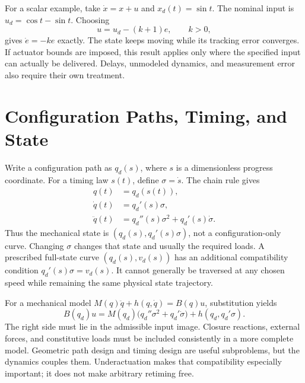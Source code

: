 For a scalar example, take $\dot x=x+u$ and $x_d(t)=\sin t$. The nominal input
is $u_d=\cos t-\sin t$. Choosing
\begin{equation}
 u=u_d-(k+1)e,\qquad k>0,
 \label{eq:motion_tracking_example}
\end{equation}
gives $\dot e=-ke$ exactly. The state keeps moving while its tracking error
converges. If actuator bounds are imposed, this result applies only where the
specified input can actually be delivered. Delays, unmodeled dynamics, and
measurement error also require their own treatment.

\section{Configuration Paths, Timing, and State}

Write a configuration path as $q_d(s)$, where $s$ is a dimensionless progress
coordinate. For a timing law $s(t)$, define $\sigma=\dot s$. The chain rule gives
\begin{equation}
 \begin{aligned}
 q(t)&=q_d(s(t)),\\
 \dot q(t)&=q_d'(s)\sigma,\\
 \ddot q(t)&=q_d''(s)\sigma^2+q_d'(s)\dot\sigma.
 \end{aligned}
 \label{eq:motion_path_timing}
\end{equation}
Thus the mechanical state is $(q_d(s),q_d'(s)\sigma)$, not a configuration-only
curve. Changing $\sigma$ changes that state and usually the required loads.
A prescribed full-state curve $(q_d(s),v_d(s))$ has an additional compatibility
condition $q_d'(s)\sigma=v_d(s)$. It cannot generally be traversed at any chosen
speed while remaining the same physical state trajectory.

For a mechanical model $M(q)\ddot q+h(q,\dot q)=B(q)u$, substitution yields
\begin{equation}
 B(q_d)u=M(q_d)\bigl(q_d''\sigma^2+q_d'\dot\sigma\bigr)
             +h(q_d,q_d'\sigma).
 \label{eq:motion_timing_feasibility}
\end{equation}
The right side must lie in the admissible input image. Closure reactions,
external forces, and constitutive loads must be included consistently in a
more complete model. Geometric path design and timing design are useful
subproblems, but the dynamics couples them. Underactuation makes that
compatibility especially important; it does not make arbitrary retiming free.

